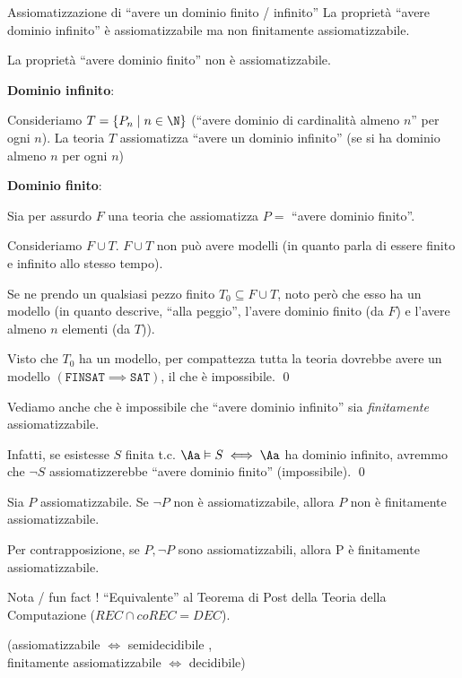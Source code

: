 \documentclass[a4paper,11pt]{report}
\begin{document}
\begin{propframe}{Assiomatizzazione di ``avere un dominio finito / infinito''}{}
    La proprietà ``avere dominio infinito'' è assiomatizzabile ma non finitamente assiomatizzabile.

    La proprietà ``avere dominio finito'' non è assiomatizzabile.
\end{propframe}

\begin{pframe}
    \textbf{Dominio infinito}:

Consideriamo \( T = \{P_n \mid n \in \N\} \) (``avere dominio di cardinalità almeno \( n \)'' per ogni \( n \)). La teoria \( T \) assiomatizza ``avere un dominio infinito'' {\color{gray}\small (se si ha dominio almeno \( n \) per ogni \( n \))}

\hrulefill

\textbf{Dominio finito}:

Sia per assurdo \( F \) una teoria che assiomatizza \( P = \) ``avere dominio finito''.

Consideriamo \( F \cup T \). \( F\cup T \) non può avere modelli (in quanto parla di essere finito e infinito allo stesso tempo).

Se ne prendo un qualsiasi pezzo finito \( T_0 \subseteq F \cup T \), noto però che esso ha un modello (in quanto descrive, ``alla peggio'', l'avere dominio finito (da \( F \)) e l'avere almeno \( n \) elementi (da \( T \))).

Visto che \( T_0 \) ha un modello, per compattezza tutta la teoria dovrebbe avere un modello \( (\texttt{FINSAT}\implies \texttt{SAT}) \), il che è impossibile. \qed

\hrulefill

Vediamo anche che è impossibile che ``avere dominio infinito'' sia \textit{finitamente} assiomatizzabile.

Infatti, se esistesse \( S \) finita t.c. \( \Aa \vDash S \iff \Aa  \) ha dominio infinito, avremmo che \( \neg S \) assiomatizzerebbe ``avere dominio finito'' (impossibile). \qed
\end{pframe}

\begin{lemmaframe}{}{}
    Sia \( P \) assiomatizzabile. Se \( \neg P \) non è assiomatizzabile, allora \( P \) non è finitamente assiomatizzabile.

    Per contrapposizione, se \( P, \neg P \) sono assiomatizzabili, allora P è finitamente assiomatizzabile.

    \begin{gframe}{Nota / fun fact !}
    ``Equivalente'' al Teorema di Post della Teoria della Computazione (\( REC \cap coREC = DEC \)).
    
    (assiomatizzabile \(\iff\) semidecidibile ,
    \\finitamente assiomatizzabile \(\iff\) decidibile)
    \end{gframe}
\end{lemmaframe}
\end{document}
